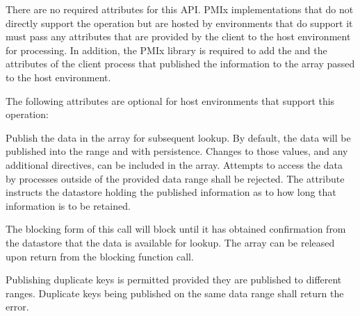 \begin{arglist}
\end{arglist}

\returnsimple

\reqattrstart
There are no required attributes for this \ac{API}. \ac{PMIx} implementations that do not directly support the operation but are hosted by environments that do support it must pass any attributes that are provided by the client to the host environment for processing. In addition, the \ac{PMIx} library is required to add the  and the  attributes of the client process that published the information to the  array passed to the host environment.

\reqattrend

\optattrstart
The following attributes are optional for host environments that support this operation:


\optattrend

\descr

Publish the data in the  array for subsequent lookup.
By default, the data will be published into the  range and with  persistence.
Changes to those values, and any additional directives, can be included in the  array. Attempts to access the data by processes outside of the provided data range shall be rejected. The  attribute instructs the datastore holding the published information as to how long that information is to be retained.

The blocking form of this call will block until it has obtained confirmation from the datastore that the data is available for lookup. The  array can be released upon return from the blocking function call.

Publishing duplicate keys is permitted provided they are published to different
ranges. Duplicate keys being published on the same data range shall return the
 error.



